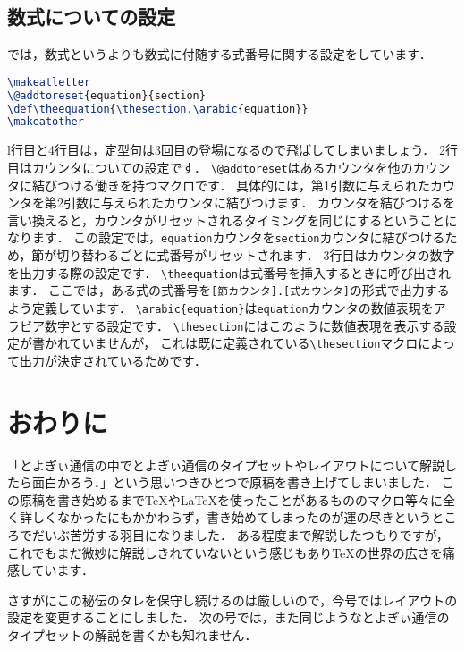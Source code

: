 \subsection{数式についての設定}

では，数式というよりも数式に付随する式番号に関する設定をしています．
\begin{lstlisting}[caption = 数式についての設定, label = list:eq, language = tex]
\makeatletter
\@addtoreset{equation}{section}
\def\theequation{\thesection.\arabic{equation}}
\makeatother
\end{lstlisting}

l行目と4行目は，定型句は3回目の登場になるので飛ばしてしまいましょう．
2行目はカウンタについての設定です．
\verb|\@addtoreset|はあるカウンタを他のカウンタに結びつける働きを持つマクロです．
具体的には，第1引数に与えられたカウンタを第2引数に与えられたカウンタに結びつけます．
カウンタを結びつけるを言い換えると，カウンタがリセットされるタイミングを同じにするということになります．
この設定では，\verb|equation|カウンタを\verb|section|カウンタに結びつけるため，節が切り替わるごとに式番号がリセットされます．
3行目はカウンタの数字を出力する際の設定です．
\verb|\theequation|は式番号を挿入するときに呼び出されます．
ここでは，ある式の式番号を\verb|[節カウンタ].[式カウンタ]|の形式で出力するよう定義しています．
\verb|\arabic{equation}|は\verb|equation|カウンタの数値表現をアラビア数字とする設定です．
\verb|\thesection|にはこのように数値表現を表示する設定が書かれていませんが，
これは既に定義されている\verb|\thesection|マクロによって出力が決定されているためです．


\section{おわりに}

「とよぎぃ通信の中でとよぎぃ通信のタイプセットやレイアウトについて解説したら面白かろう．」という思いつきひとつで原稿を書き上げてしまいました．
この原稿を書き始めるまで{\TeX}や{\LaTeX}を使ったことがあるもののマクロ等々に全く詳しくなかったにもかかわらず，書き始めてしまったのが運の尽きというところでだいぶ苦労する羽目になりました．
ある程度まで解説したつもりですが，これでもまだ微妙に解説しきれていないという感じもあり{\TeX}の世界の広さを痛感しています．

さすがにこの秘伝のタレを保守し続けるのは厳しいので，今号ではレイアウトの設定を変更することにしました．
次の号では，また同じようなとよぎぃ通信のタイプセットの解説を書くかも知れません．


